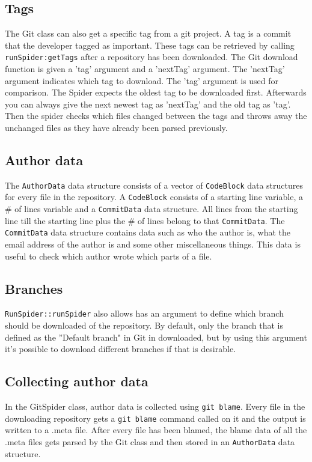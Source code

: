 \documentclass[../Main.tex]{subfiles}
\begin{document}
\subsection{Tags}
The Git class can also get a specific tag from a git project. A tag is a commit that the developer tagged as important. These tags can be retrieved by calling \texttt{runSpider:getTags} after a repository has been downloaded. The Git download function is given a 'tag' argument and a 'nextTag' argument. The 'nextTag' argument indicates which tag to download. The 'tag' argument is used for comparison. The Spider expects the oldest tag to be downloaded first. Afterwards you can always give the next newest tag as 'nextTag' and the old tag as 'tag'. Then the spider checks which files changed between the tags and throws away the unchanged files as they have already been parsed previously.
\subsection{Author data}
The \texttt{AuthorData} data structure consists of a vector of \texttt{CodeBlock} data structures for every file in the repository. A \texttt{CodeBlock} consists of a starting line variable, a \# of lines variable and a \texttt{CommitData} data structure. All lines from the starting line till the starting line plus the \# of lines belong to that \texttt{CommitData}. The \texttt{CommitData} data structure contains data such as who the author is, what the email address of the author is and some other miscellaneous things. This data is useful to check which author wrote which parts of a file.
\subsection{Branches}
\texttt{RunSpider::runSpider} also allows has an argument to define which branch should be downloaded of the repository. By default, only the branch that is defined as the ''Default branch" in Git in downloaded, but by using this argument it's possible to download different branches if that is desirable.
\subsection{Collecting author data}
In the GitSpider class, author data is collected using \texttt{git blame}. Every file in the downloading repository gets a \texttt{git blame} command called on it and the output is written to a .meta file. After every file has been blamed, the blame data of all the .meta files gets parsed by the Git class and then stored in an \texttt{AuthorData} data structure.
\end{document}
